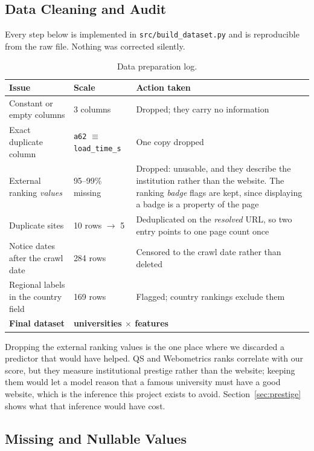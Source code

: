 \documentclass[11pt,a4paper]{article}
\begin{document}
\subsection{Data Cleaning and Audit}

Every step below is implemented in \texttt{src/build\_dataset.py} and is reproducible from the raw
file. Nothing was corrected silently.

\begin{table}[H]\centering\small
\caption{Data preparation log.}
\begin{tabular}{p{4.8cm}p{3.0cm}p{7.1cm}}
\toprule
\textbf{Issue} & \textbf{Scale} & \textbf{Action taken} \\
\midrule
Constant or empty columns & 3 columns & Dropped; they carry no information \\
Exact duplicate column & \texttt{a62} $\equiv$ \texttt{load\_time\_s} & One copy dropped \\
External ranking \emph{values} & 95--99\% missing & Dropped: unusable, and they describe the institution rather than the website. The ranking \emph{badge} flags are kept, since displaying a badge is a property of the page \\
Duplicate sites & 10 rows $\to$ 5 & Deduplicated on the \emph{resolved} URL, so two entry points to one page count once \\
Notice dates after the crawl date & 284 rows & Censored to the crawl date rather than deleted \\
Regional labels in the country field & 169 rows & Flagged; country rankings exclude them \\
\midrule
\textbf{Final dataset} & \multicolumn{2}{l}{\textbf{\nUni{} universities $\times$ \nFeat{} features}} \\
\bottomrule
\end{tabular}
\end{table}

\noindent Dropping the external ranking values is the one place where we discarded a predictor that
would have helped. QS and Webometrics ranks correlate with our score, but they measure institutional
prestige rather than the website; keeping them would let a model reason that a famous university
must have a good website, which is the inference this project exists to avoid.
Section~\ref{sec:prestige} shows what that inference would have cost.

\subsection{Missing and Nullable Values}
\end{document}

